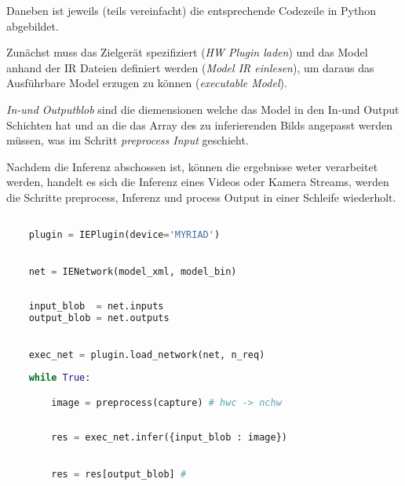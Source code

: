 Daneben ist jeweils (teils vereinfacht) die entsprechende 
Codezeile in Python abgebildet.

Zunächst muss das Zielgerät spezifiziert (\textit{HW Plugin laden})
und das Model anhand der IR Dateien definiert werden
(\textit{Model IR einlesen}), um daraus 
das Ausführbare Model erzugen zu können (\textit{executable Model}).

\textit{In-und Outputblob} sind die diemensionen welche
das Model in den In-und Output Schichten hat
und an die das Array des zu inferierenden 
Bilds angepasst werden müssen, was im Schritt 
\textit{preprocess Input} geschieht.

Nachdem die Inferenz abschossen ist, können die 
ergebnisse weter verarbeitet werden, handelt es sich 
die Inferenz eines Videos oder Kamera Streams, 
werden die Schritte preprocess, Inferenz und 
process Output in einer Schleife wiederholt.

\vspace{1cm}
\begin{minipage}{0.30\textwidth}
    \centering
    
    \label{fig:inger_engine_workflow}
\end{minipage}
\begin{minipage}{0.70\textwidth}

\begin{lstlisting}[language=Python]

    plugin = IEPlugin(device='MYRIAD')

        
    net = IENetwork(model_xml, model_bin)
        
    
    input_blob  = net.inputs
    output_blob = net.outputs
        

    exec_net = plugin.load_network(net, n_req)
        
    while True:

        image = preprocess(capture) # hwc -> nchw
        
        
        res = exec_net.infer({input_blob : image})
        

        res = res[output_blob] #
        
        
\end{lstlisting}
\vspace{1.5cm}
\end{minipage}
\vspace{1cm}


